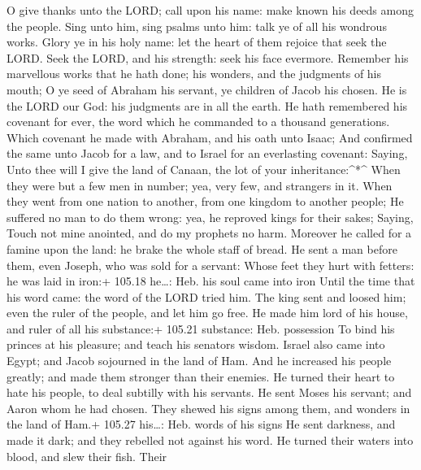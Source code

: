  O give thanks unto the LORD; call upon his name: make known
his deeds among the people.  Sing unto him, sing psalms unto
him: talk ye of all his wondrous works.  Glory ye in his
holy name: let the heart of them rejoice that seek the LORD.
 Seek the LORD, and his strength: seek his face evermore.
 Remember his marvellous works that he hath done; his
wonders, and the judgments of his mouth;  O ye seed of
Abraham his servant, ye children of Jacob his chosen.  He is
the LORD our God: his judgments are in all the earth.  He
hath remembered his covenant for ever, the word which he commanded to a
thousand generations.  Which covenant he made with Abraham,
and his oath unto Isaac;  And confirmed the same unto Jacob
for a law, and to Israel for an everlasting covenant: 
Saying, Unto thee will I give the land of Canaan, the lot of your
inheritance:\^{}*\^{}  When they were but a few men in
number; yea, very few, and strangers in it.  When they went
from one nation to another, from one kingdom to another people;
 He suffered no man to do them wrong: yea, he reproved
kings for their sakes;  Saying, Touch not mine anointed,
and do my prophets no harm.  Moreover he called for a
famine upon the land: he brake the whole staff of bread. 
He sent a man before them, even Joseph, who was sold for a servant:
 Whose feet they hurt with fetters: he was laid in iron:+
105.18 he\ldots: Heb. his soul came into iron  Until the
time that his word came: the word of the LORD tried him. 
The king sent and loosed him; even the ruler of the people, and let him
go free.  He made him lord of his house, and ruler of all
his substance:+ 105.21 substance: Heb. possession  To bind
his princes at his pleasure; and teach his senators wisdom.
 Israel also came into Egypt; and Jacob sojourned in the
land of Ham.  And he increased his people greatly; and made
them stronger than their enemies.  He turned their heart to
hate his people, to deal subtilly with his servants.  He
sent Moses his servant; and Aaron whom he had chosen.  They
shewed his signs among them, and wonders in the land of Ham.+ 105.27
his\ldots: Heb. words of his signs  He sent darkness, and
made it dark; and they rebelled not against his word.  He
turned their waters into blood, and slew their fish.  Their
